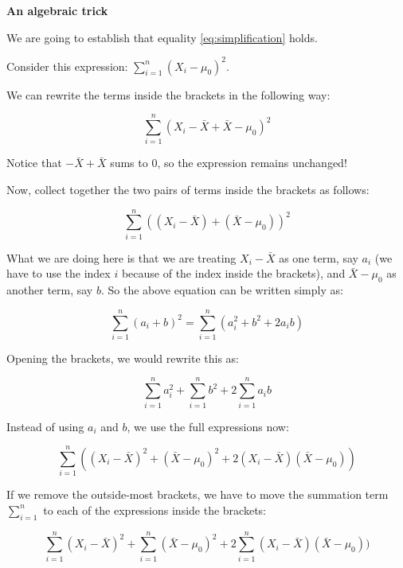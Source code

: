 \documentclass[
  12pt,
]{krantz}
\theoremstyle{definition}
\theoremstyle{definition}
\theoremstyle{definition}
\theoremstyle{definition}
\theoremstyle{remark}
\begin{document}
\begin{blackbox}

\textbf{An algebraic trick}

We are going to establish that equality \eqref{eq:simplification} holds.

Consider this expression: \(\sum_{i=1}^n (X_i -\mu_0)^2\).

We can rewrite the terms inside the brackets in the following way:

\begin{equation}
\sum_{i=1}^n (X_i - \bar{X} + \bar{X} -\mu_0)^2
\end{equation}

Notice that \(-\bar{X} + \bar{X}\) sums to 0, so the expression remains unchanged!

Now, collect together the two pairs of terms inside the brackets as follows:

\begin{equation}
\sum_{i=1}^n ((X_i - \bar{X}) + (\bar{X} -\mu_0))^2
\end{equation}

What we are doing here is that we are treating \(X_i - \bar{X}\) as one term, say \(a_i\) (we have to use the index \(i\) because of the index inside the brackets), and \(\bar{X} -\mu_0\) as another term, say \(b\). So the above equation can be written simply as:

\begin{equation}
\sum_{i=1}^n (a_i + b)^2 = \sum_{i=1}^n (a_i^2 + b^2 + 2a_i b)
\end{equation}

Opening the brackets, we would rewrite this as:

\begin{equation}
\sum_{i=1}^n a_i^2 + \sum_{i=1}^nb^2 + 2\sum_{i=1}^n a_i b
\end{equation}

Instead of using \(a_i\) and \(b\), we use the full expressions now:

\begin{equation}
\sum_{i=1}^n ((X_i - \bar{X})^2 + (\bar{X} -\mu_0)^2 + 2 (X_i - \bar{X})(\bar{X} -\mu_0) )
\end{equation}

If we remove the outside-most brackets, we have to move the summation term \(\sum_{i=1}^n\) to each of the expressions inside the brackets:

\begin{equation}
\sum_{i=1}^n (X_i - \bar{X})^2 +\sum_{i=1}^n (\bar{X} -\mu_0)^2 + 
2\sum_{i=1}^n (X_i - \bar{X})(\bar{X} -\mu_0) )
\end{equation}


\end{blackbox}
\end{document}
